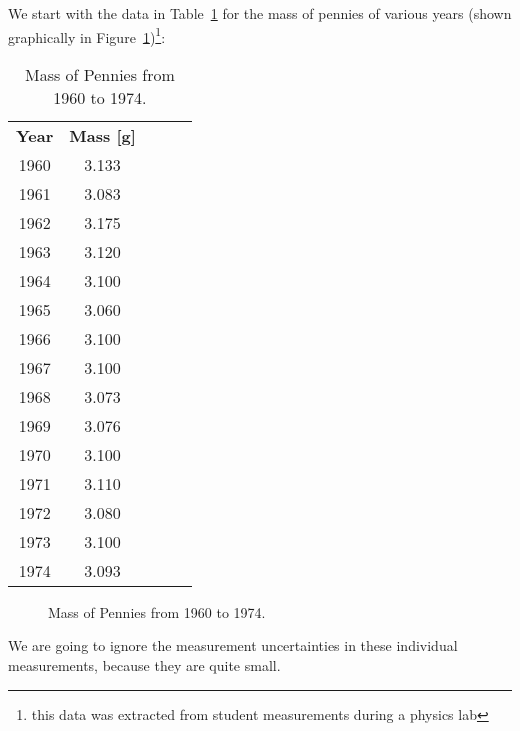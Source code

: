 We start with the data in Table~\ref{tbl:penny1} for the mass of pennies of various years (shown graphically in Figure~\ref{fig:penny1})\footnote{this data was extracted from student measurements during a physics lab}:
\begin{table}
\begin{center}
\begin{tabular}{ccccc}
\toprule
{\bf Year} & {\bf Mass [g]} \\
1960& 3.133\\
1961& 3.083\\
1962& 3.175\\
1963& 3.120\\
1964& 3.100\\
1965& 3.060\\
1966& 3.100\\
1967& 3.100\\
1968& 3.073\\
1969& 3.076\\
1970& 3.100\\
1971& 3.110\\
1972& 3.080\\
1973& 3.100\\
1974& 3.093\\
\bottomrule
\end{tabular}
\end{center}
\caption{Mass of Pennies from 1960 to 1974.}
\label{tbl:penny1}
\end{table}

\begin{figure}
\caption{Mass of Pennies from 1960 to 1974.}\label{fig:penny1}
\end{figure}

We are going to ignore the measurement uncertainties in these individual measurements, because they are quite small.



